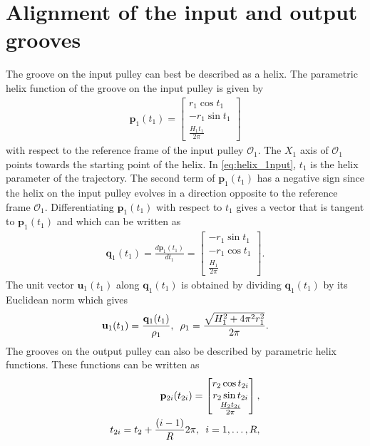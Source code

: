 \documentclass[10pt,cleanfoot]{asme2ej}
\newcommand{\hquad}{\hspace{0.5em}}
\begin{document}
\section{Alignment of the input and output grooves}
 The groove on the input pulley can best be described as a helix. The parametric helix function of the groove on the input pulley is given by 
 \begin{align}
     \mathbf{p}_1(t_1) = \begin{bmatrix}
     r_1\cos t_1\\-r_1\sin t_1\\\frac{H_1t_1}{2\pi}
     \end{bmatrix}
     \label{eq:helix_1nput}
 \end{align}
  with respect to the reference frame of the input pulley $\mathcal{O}_1$. The $X_1$ axis of $\mathcal{O}_1$ points towards the starting point of the helix. In \eqref{eq:helix_1nput},
 $t_1$ is the helix parameter of the trajectory. The second term of $\mathbf{p}_1(t_1)$ has a negative sign since the helix on the input pulley evolves in a direction opposite to the reference frame $\mathcal{O}_1$. Differentiating $\mathbf{p}_1(t_1)$ with respect to $t_1$ gives a vector that is tangent to $\mathbf{p}_1(t_1)$ and which can be written as
 \begin{align}
     \mathbf{q}_1(t_1) = \frac{d\mathbf{p}_1(t_1)}{dt_1} = \begin{bmatrix}
     -r_1\sin t_1\\-r_1\cos t_1\\\frac{H_1}{2\pi}
     \end{bmatrix}. 
 \end{align}
 The unit vector $\mathbf{u}_1(t_1)$ along $\mathbf{q}_1(t_1)$ is obtained by dividing $\mathbf{q}_1(t_1)$ by its Euclidean norm which gives
 \begin{align}
     \mathbf{u}_1(t_1) = \frac{\mathbf{q}_1(t_1)}{\rho_1}, \hquad \rho_1 = \frac{\sqrt{H_1^2+4\pi^2r_1^2}}{2\pi}.
 \end{align}
  The grooves on the output pulley can also be described by parametric helix functions. These functions can be written as
  \begin{align}
      \mathbf{p}_{2i}(t_{2i}) = \begin{bmatrix}
      r_2\cos t_{2i}\\
      r_2\sin t_{2i}\\
      \frac{H_2 t_{2i}}{2\pi}
      \end{bmatrix},\\ t_{2i} = t_2+\frac{(i-1)}{R}2\pi, \hquad i =1 ,\ldots , R,
      \label{eq:output_helix}
  \end{align}
\end{document}
